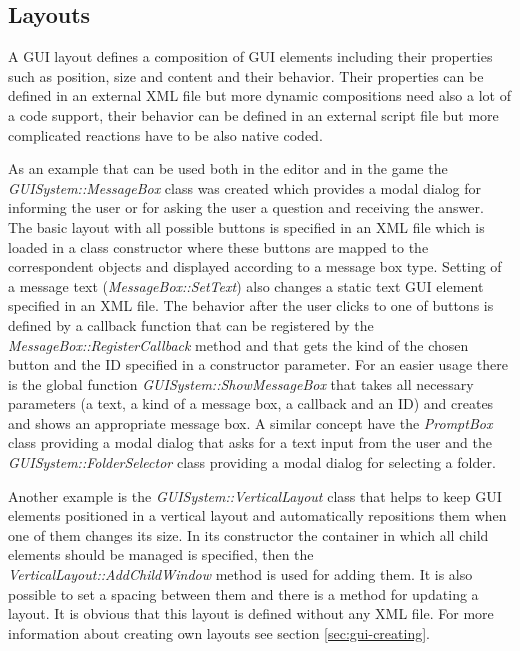 \subsection{Layouts}
\label{sec:gui-layouts}

A GUI layout defines a composition of GUI elements including their properties such as position, size and content and their behavior. Their properties can be defined in an external XML file but more dynamic compositions need also a lot of a code support, their behavior can be defined in an external script file but more complicated reactions have to be also native coded.

As an example that can be used both in the editor and in the game the \emph{GUISystem::MessageBox} class was created which provides a modal dialog for informing the user or for asking the user a question and receiving the answer. The basic layout with all possible buttons is specified in an XML file which is loaded in a class constructor where these buttons are mapped to the correspondent objects and displayed according to a message box type. Setting of a message text (\emph{MessageBox::SetText}) also changes a static text GUI element specified in an XML file. The behavior after the user clicks to one of buttons is defined by a callback function that can be registered by the \emph{MessageBox::RegisterCallback} method and that gets the kind of the chosen button and the ID specified in a constructor parameter. For an easier usage there is the global function \emph{GUISystem::ShowMessageBox} that takes all necessary parameters (a text, a kind of a message box, a callback and an ID) and creates and shows an appropriate message box. A similar concept have the \emph{PromptBox} class providing a modal dialog that asks for a text input from the user and the \emph{GUISystem::FolderSelector} class providing a modal dialog for selecting a folder.

Another example is the \emph{GUISystem::VerticalLayout} class that helps to keep GUI elements positioned in a vertical layout and automatically repositions them when one of them changes its size. In its constructor the container in which all child elements should be managed is specified, then the \emph{VerticalLayout::AddChildWindow} method is used for adding them. It is also possible to set a spacing between them and there is a method for updating a layout. It is obvious that this layout is defined without any XML file. For more information about creating own layouts see section \ref{sec:gui-creating}.

